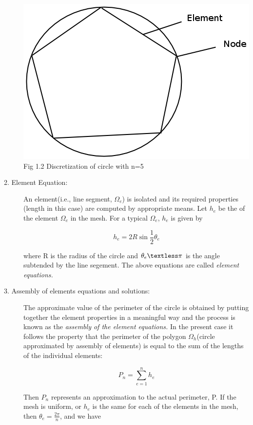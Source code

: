 \documentclass{report}
\numberwithin{equation}{chapter}
\begin{document}
\begin{spacing}{1.5}
\begin{description}
  \begin{center}
  \includegraphics[scale=0.5]{circle1}\\
  Fig 1.2 Discretization of circle with n=5
  \end{center}
  \item[2. Element Equation:] An element(i.e., line segment, $\Omega_{e}$) is isolated and its required properties (length in this case) are computed by appropriate means. Let $h_{e}$ be the of the element $\Omega_{e}$ in the mesh. For a typical $\Omega_{e}$, $h_{e}$ is given by
  \begin{center}
  \begin{equation}
  	h_{e}= 2R\sin\frac{1}{2}\theta_{e}
  \end{equation}
  \end{center}
  where R is the radius of the circle and $\theta_{e} \textless \pi$ is the angle subtended by the line segement. The above equations are called \textsl{element equations.}
  \item[3. Assembly of elements equations and solutions:] The approximate value of the perimeter of the circle is obtained by putting together the element properties in a meaningful way and the process is known as the \textsl{assembly of the element equations.} In the present case it follows the property that the perimeter of the polygon $\Omega_{h}$(circle approximated by assembly of elements) is equal to the sum of the lengths of the individual elements:
  \begin{center}
    \begin{equation}
    	P_{n}= \sum_{e=1}^{n}h_{e}
    \end{equation}
    \end{center}
    Then $P_{n}$ represents an approximation to the actual perimeter, P. If the mesh is uniform, or $h_{e}$ is the same for each of the elements in the mesh, then $\theta_{e} = \frac{2\pi}{n}$, and we have

\end{description}
\end{spacing}
\end{document}
